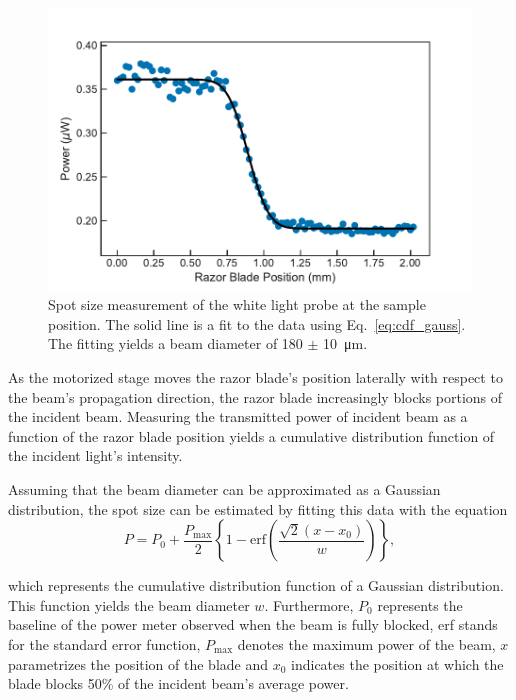 \begin{figure}[h]
	\centering
	\includegraphics[scale=0.65]{images/chapter_methods/probe_spot_size}
	\caption{Spot size measurement of the white light probe at the sample position. The solid line is a fit to the data using Eq.\ \ref{eq:cdf_gauss}. The fitting yields a beam diameter of 180 $\pm$ \SI{10}{\micro\meter}. }
\end{figure}


As the motorized stage moves the razor blade's position laterally with respect to the beam's propagation direction, the razor blade increasingly blocks portions of the incident beam.  Measuring the transmitted power of incident beam as a function of the razor blade position yields a cumulative distribution function of the incident light's intensity.


Assuming that the beam diameter can be approximated as a Gaussian distribution, the spot size can be estimated by fitting this data with the equation 
\begin{equation}
	\label{eq:cdf_gauss}
	P = P_0 + \dfrac{P_{\mathrm{max}}}{2} \left\{ 1 - \mathrm{erf} \left( \dfrac{\sqrt{2}(x - x_0)}{w} \right) \right\},
\end{equation}

which represents the cumulative distribution function of a Gaussian distribution. This function yields the beam diameter $w$. Furthermore, $P_0$ represents the baseline of the power meter observed when the beam is fully blocked, erf stands for the standard error function, $P_\text{max}$ denotes the maximum power of the beam, $x$ parametrizes the position of the blade and $x_0$ indicates the position at which the blade blocks 50\% of the incident beam's average power.  

